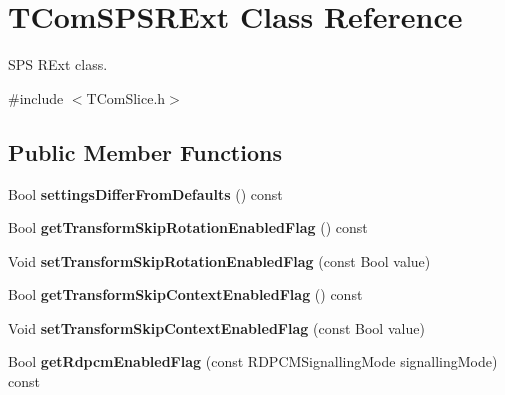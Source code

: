 \hypertarget{class_t_com_s_p_s_r_ext}{}\section{T\+Com\+S\+P\+S\+R\+Ext Class Reference}
\label{class_t_com_s_p_s_r_ext}


S\+PS R\+Ext class.  




{\ttfamily \#include $<$T\+Com\+Slice.\+h$>$}

\subsection*{Public Member Functions}
\begin{DoxyCompactItemize}
\item 
\mbox{\label{class_t_com_s_p_s_r_ext_a4728e03a54d0404cd2c441a55e38df99}} 
Bool {\bfseries settings\+Differ\+From\+Defaults} () const
\item 
\mbox{\label{class_t_com_s_p_s_r_ext_a2aca1c616ed3f8a3fc0d2a4824badf57}} 
Bool {\bfseries get\+Transform\+Skip\+Rotation\+Enabled\+Flag} () const
\item 
\mbox{\label{class_t_com_s_p_s_r_ext_a5f6b9d4eb338207e92f0f05d7aa2bd04}} 
Void {\bfseries set\+Transform\+Skip\+Rotation\+Enabled\+Flag} (const Bool value)
\item 
\mbox{\label{class_t_com_s_p_s_r_ext_a450a843de29e102f32c5937b2279302c}} 
Bool {\bfseries get\+Transform\+Skip\+Context\+Enabled\+Flag} () const
\item 
\mbox{\label{class_t_com_s_p_s_r_ext_a15b2f0fe0c8470ab0e7941daa4d04b7f}} 
Void {\bfseries set\+Transform\+Skip\+Context\+Enabled\+Flag} (const Bool value)
\item 
\mbox{\label{class_t_com_s_p_s_r_ext_a24ff76b7ba61a4fd81afbe39b98fd39d}} 
Bool {\bfseries get\+Rdpcm\+Enabled\+Flag} (const R\+D\+P\+C\+M\+Signalling\+Mode signalling\+Mode) const
\item 
\mbox{\label{class_t_com_s_p_s_r_ext_a798809c6ff5a706d644cd4d2487c2409}} 

\end{DoxyCompactItemize}
